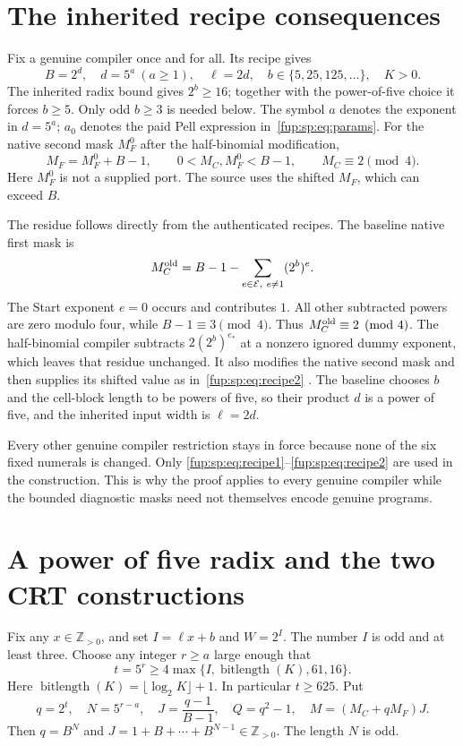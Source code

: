 \documentclass[11pt,letterpaper]{article}
\theoremstyle{definition}\newtheorem{definition}[theorem]{Definition}
\theoremstyle{remark}\newtheorem{remark}[theorem]{Remark}
\newcommand{\pos}{\mathbb Z_{>0}}
\begin{document}
\section{The inherited recipe consequences}
\label{fup:sp:sec:recipe}
Fix a genuine compiler once and for all. Its recipe gives
\begin{equation}
B=2^d,\quad d=5^a\ (a\ge1),\quad \ell=2d,\quad
b\in\{5,25,125,\ldots\},\quad K>0.
\label{fup:sp:eq:recipe1}
\end{equation}
The inherited radix bound gives $2^b\ge16$; together with the
power-of-five choice it forces $b\ge5$. Only odd $b\ge3$ is
needed below. The symbol $a$ denotes the exponent in $d=5^a$;
$a_0$ denotes the paid Pell expression in~\eqref{fup:sp:eq:params}.
For the native second mask $M_F^0$ after the half-binomial modification,
\begin{equation}
M_F=M_F^0+B-1,\qquad
0<M_C,M_F^0<B-1,\qquad M_C\equiv2\pmod4.
\label{fup:sp:eq:recipe2}
\end{equation}
Here $M_F^0$ is not a supplied port. The source uses the shifted $M_F$,
which can exceed $B$.

The residue follows directly from the authenticated recipes. The
baseline native first mask is
\[
M_C^{\rm old}=B-1-\sum_{e\in\mathcal E,\ e\ne1}(2^b)^e.
\]
The Start exponent $e=0$ occurs and contributes $1$. All other
subtracted powers are zero modulo four, while $B-1\equiv3\pmod4$.
Thus $M_C^{\rm old}\equiv2\pmod4$. The half-binomial compiler subtracts
$2(2^b)^{e_*}$ at a nonzero ignored dummy exponent, which leaves that
residue unchanged. It also modifies the native second mask and then
supplies its shifted value as in~\eqref{fup:sp:eq:recipe2}
\cite{fup:sp:recipe76,fup:sp:recipe75}. The baseline chooses $b$ and the cell-block
length to be powers of five, so their product $d$ is a power of five,
and the inherited input width is $\ell=2d$.

Every other genuine compiler restriction stays in force because none
of the six fixed numerals is changed. Only
\eqref{fup:sp:eq:recipe1}--\eqref{fup:sp:eq:recipe2} are used in the construction.
This is why the proof applies to every genuine compiler while the
bounded diagnostic masks need not themselves encode genuine programs.

\section{A power of five radix and the two CRT constructions}
\label{fup:sp:sec:crt}
Fix any $x\in\pos$, and set $I=\ell x+b$ and $W=2^I$.
The number $I$ is odd and at least three. Choose any integer $r\ge a$
large enough that
\begin{equation}
t=5^r\ge4\max\{I,\operatorname{bitlength}(K),61,16\}.
\label{fup:sp:eq:tsize}
\end{equation}
Here $\operatorname{bitlength}(K)=\lfloor\log_2K\rfloor+1$.
In particular $t\ge625$. Put
\begin{equation}
q=2^t,\quad N=5^{r-a},\quad J=\frac{q-1}{B-1},\quad
Q=q^2-1,\quad M=(M_C+qM_F)J.
\label{fup:sp:eq:radix}
\end{equation}
Then $q=B^N$ and $J=1+B+\cdots+B^{N-1}\in\pos$. The length $N$ is odd.
\end{document}
